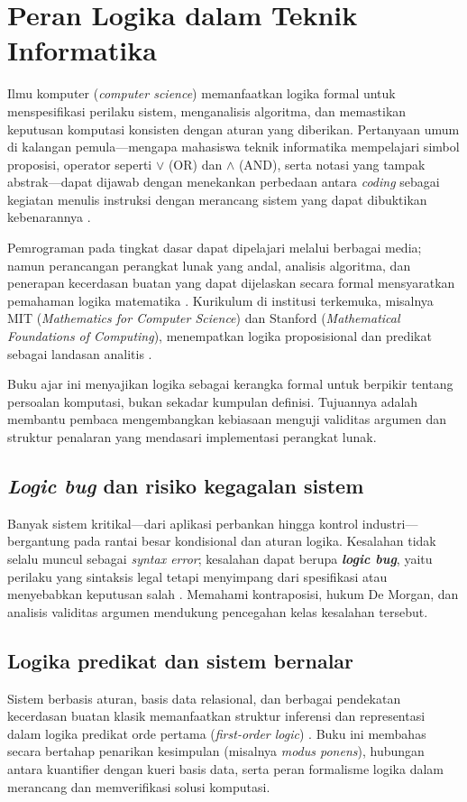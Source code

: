 \section{Peran Logika dalam Teknik Informatika}

Ilmu komputer (\textit{computer science}) memanfaatkan logika formal untuk menspesifikasi perilaku sistem, menganalisis algoritma, dan memastikan keputusan komputasi konsisten dengan aturan yang diberikan. Pertanyaan umum di kalangan pemula---mengapa mahasiswa teknik informatika mempelajari simbol proposisi, operator seperti $\lor$ (OR) dan $\land$ (AND), serta notasi yang tampak abstrak---dapat dijawab dengan menekankan perbedaan antara \textit{coding} sebagai kegiatan menulis instruksi dengan merancang sistem yang dapat dibuktikan kebenarannya \cite{rosen2019,copi2014}.

Pemrograman pada tingkat dasar dapat dipelajari melalui berbagai media; namun perancangan perangkat lunak yang andal, analisis algoritma, dan penerapan kecerdasan buatan yang dapat dijelaskan secara formal mensyaratkan pemahaman logika matematika \cite{levin_discrete,stanford_cs103}. Kurikulum di institusi terkemuka, misalnya MIT (\textit{Mathematics for Computer Science}) dan Stanford (\textit{Mathematical Foundations of Computing}), menempatkan logika proposisional dan predikat sebagai landasan analitis \cite{mit_6042,stanford_cs103}.

Buku ajar ini menyajikan logika sebagai kerangka formal untuk berpikir tentang persoalan komputasi, bukan sekadar kumpulan definisi. Tujuannya adalah membantu pembaca mengembangkan kebiasaan menguji validitas argumen dan struktur penalaran yang mendasari implementasi perangkat lunak.

\subsection{\textit{Logic bug} dan risiko kegagalan sistem}

Banyak sistem kritikal---dari aplikasi perbankan hingga kontrol industri---bergantung pada rantai besar kondisional dan aturan logika. Kesalahan tidak selalu muncul sebagai \textit{syntax error}; kesalahan dapat berupa \textbf{\textit{logic bug}}, yaitu perilaku yang sintaksis legal tetapi menyimpang dari spesifikasi atau menyebabkan keputusan salah \cite{forallx,iep_natded}. Memahami kontraposisi, hukum De Morgan, dan analisis validitas argumen mendukung pencegahan kelas kesalahan tersebut.

\subsection{Logika predikat dan sistem bernalar}

Sistem berbasis aturan, basis data relasional, dan berbagai pendekatan kecerdasan buatan klasik memanfaatkan struktur inferensi dan representasi dalam logika predikat orde pertama (\textit{first-order logic}) \cite{rosen2019,saylor_cs202}. Buku ini membahas secara bertahap penarikan kesimpulan (misalnya \textit{modus ponens}), hubungan antara kuantifier dengan kueri basis data, serta peran formalisme logika dalam merancang dan memverifikasi solusi komputasi.
